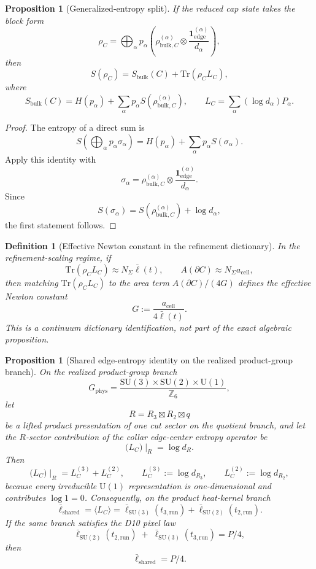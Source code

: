 \documentclass[11pt]{article}
\newtheorem{proposition}[theorem]{Proposition}
\newtheorem{definition}[theorem]{Definition}
\newcommand{\SU}{\mathrm{SU}}
\newcommand{\U}{\mathrm{U}}
\newcommand{\ellbar}{\bar{\ell}}
\begin{document}
\begin{proposition}[Generalized-entropy split]\label{prop:gensplit}
If the reduced cap state takes the block form
\[
\rho_C=
\bigoplus_\alpha p_\alpha
\left(
\rho^{(\alpha)}_{\mathrm{bulk},C}\otimes
\frac{\mathbf 1^{(\alpha)}_{\mathrm{edge}}}{d_\alpha}
\right),
\]
then
\[
S(\rho_C)=S_{\mathrm{bulk}}(C)+\mathrm{Tr}(\rho_C L_C),
\]
where
\[
S_{\mathrm{bulk}}(C)=H(p_\alpha)+\sum_\alpha p_\alpha S(\rho^{(\alpha)}_{\mathrm{bulk},C}),
\qquad
L_C=\sum_\alpha (\log d_\alpha)P_\alpha.
\]
\end{proposition}

\begin{proof}
The entropy of a direct sum is
\[
S\!\left(\bigoplus_\alpha p_\alpha \sigma_\alpha\right)
=
H(p_\alpha)+\sum_\alpha p_\alpha S(\sigma_\alpha).
\]
Apply this identity with
\[
\sigma_\alpha=
\rho^{(\alpha)}_{\mathrm{bulk},C}\otimes
\frac{\mathbf 1^{(\alpha)}_{\mathrm{edge}}}{d_\alpha}.
\]
Since
\[
S(\sigma_\alpha)=S(\rho^{(\alpha)}_{\mathrm{bulk},C})+\log d_\alpha,
\]
the first statement follows.
\end{proof}

\begin{definition}[Effective Newton constant in the refinement dictionary]\label{def:newton}
In the refinement-scaling regime, if
\[
\mathrm{Tr}(\rho_C L_C)\approx N_\Sigma \bar\ell(t),
\qquad
A(\partial C)\approx N_\Sigma a_{\mathrm{cell}},
\]
then matching $\mathrm{Tr}(\rho_C L_C)$ to the area term $A(\partial C)/(4G)$ defines the effective Newton constant
\[
G:=\frac{a_{\mathrm{cell}}}{4\bar\ell(t)}.
\]
This is a continuum dictionary identification, not part of the exact algebraic proposition.
\end{definition}

\begin{proposition}[Shared edge-entropy identity on the realized product-group branch]\label{prop:sharededgeentropy}
On the realized product-group branch
\[
G_{\mathrm{phys}}
=
\frac{\SU(3)\times\SU(2)\times\U(1)}{\mathbb Z_6},
\]
let
\[
R=R_3\boxtimes R_2\boxtimes q
\]
be a lifted product presentation of one cut sector on the quotient branch, and let the
\(R\)-sector contribution of the collar edge-center entropy operator be
\[
\bigl(L_C\bigr)\!\mid_R=\log d_R.
\]
Then
\[
\bigl(L_C\bigr)\!\mid_R
=
L_C^{(3)}+L_C^{(2)},
\qquad
L_C^{(3)}:=\log d_{R_3},
\qquad
L_C^{(2)}:=\log d_{R_2},
\]
because every irreducible \( \U(1) \) representation is one-dimensional and contributes \(\log 1=0\). Consequently, on the product heat-kernel branch
\[
\ellbar_{\mathrm{shared}}
=
\langle L_C\rangle
=
\ellbar_{\mathrm{SU(3)}}(t_{3,\mathrm{run}})
+
\ellbar_{\mathrm{SU(2)}}(t_{2,\mathrm{run}}).
\]
If the same branch satisfies the D10 pixel law
\[
\ellbar_{\mathrm{SU(2)}}(t_{2,\mathrm{run}})
\;+\;
\ellbar_{\mathrm{SU(3)}}(t_{3,\mathrm{run}})
=
P/4,
\]
then
\[
\ellbar_{\mathrm{shared}}=P/4.
\]
\end{proposition}
\end{document}
